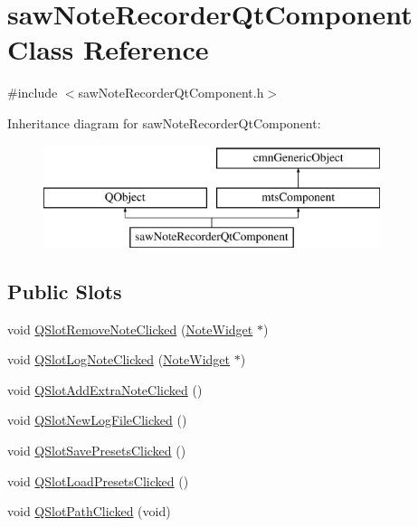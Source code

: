 \hypertarget{classsaw_note_recorder_qt_component}{}\section{saw\+Note\+Recorder\+Qt\+Component Class Reference}
\label{classsaw_note_recorder_qt_component}


{\ttfamily \#include $<$saw\+Note\+Recorder\+Qt\+Component.\+h$>$}

Inheritance diagram for saw\+Note\+Recorder\+Qt\+Component\+:\begin{figure}[H]
\begin{center}
\leavevmode
\includegraphics[height=3.000000cm]{da/db1/classsaw_note_recorder_qt_component}
\end{center}
\end{figure}
\subsection*{Public Slots}
\begin{DoxyCompactItemize}
\item 
void \hyperlink{classsaw_note_recorder_qt_component_a113814071efb1495e85733937fd81bdd}{Q\+Slot\+Remove\+Note\+Clicked} (\hyperlink{class_note_widget}{Note\+Widget} $\ast$)
\item 
void \hyperlink{classsaw_note_recorder_qt_component_a2c404e747767ca50917e228d6b57fcaa}{Q\+Slot\+Log\+Note\+Clicked} (\hyperlink{class_note_widget}{Note\+Widget} $\ast$)
\item 
void \hyperlink{classsaw_note_recorder_qt_component_a71f17fb009688347d4c2c1b6e64a0007}{Q\+Slot\+Add\+Extra\+Note\+Clicked} ()
\item 
void \hyperlink{classsaw_note_recorder_qt_component_ad11411ae86a4e3ec47dd47a0ab4252a3}{Q\+Slot\+New\+Log\+File\+Clicked} ()
\item 
void \hyperlink{classsaw_note_recorder_qt_component_a7901ca9f2a13beb8244f1f539c75f7aa}{Q\+Slot\+Save\+Presets\+Clicked} ()
\item 
void \hyperlink{classsaw_note_recorder_qt_component_a75f01e5fdce86d58b0396103fa91c104}{Q\+Slot\+Load\+Presets\+Clicked} ()
\item 
void \hyperlink{classsaw_note_recorder_qt_component_a47448ba1acafc9910c5c8617278c15a4}{Q\+Slot\+Path\+Clicked} (void)
\end{DoxyCompactItemize}
